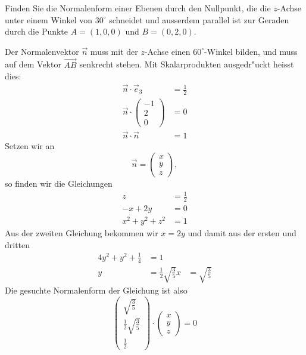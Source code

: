 Finden Sie die Normalenform einer Ebenen durch den
Nullpunkt, die die $z$-Achse
unter einem Winkel von $30^\circ$ schneidet und ausserdem
parallel ist zur Geraden durch die Punkte $A=(1,0,0)$ und
$B=(0,2,0)$.

\begin{loesung}
Der Normalenvektor $\vec n$ muss mit der $z$-Achse einen $60^\circ$-Winkel
bilden, und muss auf dem Vektor $\overrightarrow{AB}$ senkrecht stehen.
Mit Skalarprodukten ausgedr"uckt heisst dies:
\begin{align*}
\vec n\cdot \vec e_3&=\frac12\\
\vec n\cdot \begin{pmatrix}-1\\2\\0\end{pmatrix}&=0\\
\vec n\cdot\vec n&=1
\end{align*}
Setzen wir an
\[
\vec n =
\begin{pmatrix}x\\y\\z\end{pmatrix},
\]
so finden wir die Gleichungen
\begin{align*}
z&= \frac12\\
-x+2y&=0\\
x^2+y^2+z^2&=1
\end{align*}
Aus der zweiten Gleichung bekommen wir $x=2y$ und damit aus der ersten
und dritten
\begin{align*}
4y^2+y^2+\frac14&=1
\\
y&=\frac12\sqrt{\frac35}
x&=\sqrt{\frac35}
\end{align*}
Die gesuchte Normalenform der Gleichung ist also
\[
\begin{pmatrix}
\sqrt{\frac35}\\
\frac12\sqrt{\frac35}\\
\frac12
\end{pmatrix}\cdot \begin{pmatrix}x\\y\\z\end{pmatrix} =0
\]
\end{loesung}

